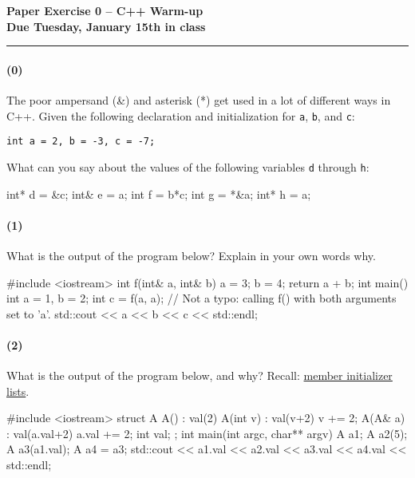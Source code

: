 \documentclass[12pt,letterpaper,twoside]{article}
\begin{document}
{\centering \textbf{Paper Exercise 0 -- C++ Warm-up\\ Due Tuesday, January 15th in class} \par}
\vspace*{-8pt}\noindent\rule{\linewidth}{1pt}

\paragraph{(0)} The poor ampersand (\&) and asterisk (*) get used in a lot of different ways in C++. Given the following declaration and initialization for {\tt a}, {\tt b}, and {\tt c}:
\begin{verbatim}
int a = 2, b = -3, c = -7;
\end{verbatim}
\vspace{-1ex}
What can you say about the values of the following variables {\tt d} through {\tt h}:
{\small
\begin{cpp}
int* d = &c;
int& e = a;
int f  = b*c;
int g  = *&a;
int* h = a;
\end{cpp}
}

\vspace{-2ex}
\paragraph{(1)} What is the output of the program below? Explain in your own words why.
\begin{cpp}
#include <iostream>
int f(int& a, int& b) {
  a = 3;
  b = 4;
  return a + b;
}
int main() {
  int a = 1, b = 2;
  int c = f(a, a);  // Not a typo: calling f() with both arguments set to 'a'.
  std::cout << a << b << c << std::endl;
}
\end{cpp}

\vspace{-2ex}
\paragraph{(2)} What is the output of the program below, and why?  Recall: \href{https://en.cppreference.com/w/cpp/language/initializer_list}{member initializer lists}.
{\small
\begin{cpp}
#include <iostream>
struct A {
  A() : val(2) {}
  A(int v) : val(v+2) { v += 2; }
  A(A& a) : val(a.val+2) { a.val += 2; } 
  int val;
};
int main(int argc, char** argv) {
  A a1;
  A a2(5);
  A a3(a1.val);
  A a4 = a3;  
  std::cout << a1.val << a2.val << a3.val << a4.val << std::endl;
}
\end{cpp}
}
\end{document}

